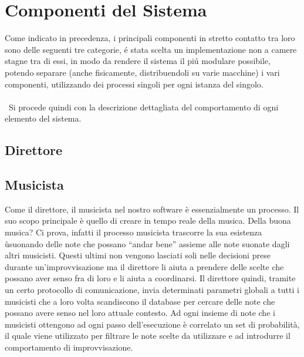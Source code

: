 \section{Componenti del Sistema}
Come indicato in precedenza, i principali componenti in stretto contatto
tra loro sono delle seguenti tre categorie, \'e stata scelta un implementazione
non a camere stagne tra di essi, in modo da rendere il sistema il pi\'u modulare
possibile, potendo separare (anche fisicamente, distribuendoli su varie macchine)
i vari componenti, utilizzando dei processi singoli per ogni istanza del singolo.\\\
\\\
Si procede quindi con la descrizione dettagliata del comportamento di ogni
elemento del sistema.

\subsection{Direttore}

\subsection{Musicista}
Come il direttore, il musicista nel nostro software è essenzialmente un processo. 
Il suo scopo principale è quello di creare in tempo reale della musica. 
Della buona musica? Ci prova, infatti il processo musicista trascorre la
sua esistenza ùsuonando delle note che possano ``andar bene'' assieme alle note
 suonate dagli altri musicisti. Questi ultimi non vengono lasciati soli nelle 
decisioni prese durante un'improvvisazione ma il direttore li aiuta a prendere 
delle scelte che possano aver senso fra di loro e li aiuta a coordinarsi. 
Il direttore quindi, tramite un certo protocollo di comunicazione, 
invia determinati parametri globali a tutti i musicisti che a loro volta 
scandiscono il database per cercare delle note che possano avere senso nel loro 
attuale contesto. 
Ad ogni insieme di note che i musicisti ottengono ad ogni passo dell'esecuzione
 è correlato un set di probabilità, il quale viene utilizzato per filtrare le 
note scelte da utilizzare e ad introdurre il comportamento di improvvisazione.

